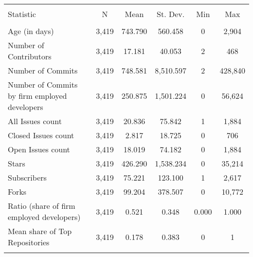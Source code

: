 

\begin{tabular}{@{\extracolsep{5pt}}lccccc}
\\[-1.8ex]\hline
\hline \\[-1.8ex]
Statistic & \multicolumn{1}{c}{N} & \multicolumn{1}{c}{Mean} & \multicolumn{1}{c}{St. Dev.} & \multicolumn{1}{c}{Min} & \multicolumn{1}{c}{Max} \\
\hline \\[-1.8ex]
Age (in days) & 3,419 & 743.790 & 560.458 & 0 & 2,904 \\
Number of Contributors & 3,419 & 17.181 & 40.053 & 2 & 468 \\
Number of Commits & 3,419 & 748.581 & 8,510.597 & 2 & 428,840 \\
Number of Commits by firm employed developers & 3,419 & 250.875 & 1,501.224 & 0 & 56,624 \\
All Issues count & 3,419 & 20.836 & 75.842 & 1 & 1,884 \\
Closed Issues count & 3,419 & 2.817 & 18.725 & 0 & 706 \\
Open Issues count & 3,419 & 18.019 & 74.182 & 0 & 1,884 \\
Stars & 3,419 & 426.290 & 1,538.234 & 0 & 35,214 \\
Subscribers & 3,419 & 75.221 & 123.100 & 1 & 2,617 \\
Forks & 3,419 & 99.204 & 378.507 & 0 & 10,772 \\
Ratio (share of firm employed developers) & 3,419 & 0.521 & 0.348 & 0.000 & 1.000 \\
Mean share of Top Repositories & 3,419 & 0.178 & 0.383 & 0 & 1 \\
\hline \\[-1.8ex]
\end{tabular}
